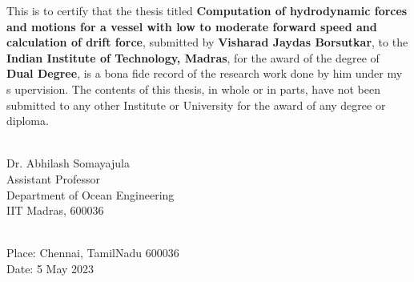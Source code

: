 \certificate


This is to certify that the thesis titled {\bf  Computation of hydrodynamic forces and motions 
for a vessel with low to moderate forward speed and calculation of drift force}, 
submitted by {\bf Visharad Jaydas Borsutkar}, to the
 {\bf Indian Institute of Technology, Madras}, for the award of the degree of 
 {\bf Dual Degree}, is a bona fide record of the research work done by him under my s
 upervision. The contents of this thesis, in whole or in parts, have not been submitted 
 to any other Institute or University for the award of any degree or diploma.
\\[3cm]

\begin{singlespacing}
\hspace*{-0.25in}
\parbox{2.5in}{
\\[0.25cm]
\noindent Dr. Abhilash Somayajula \\ [0.15cm]
\noindent Assistant Professor \\[0.15cm]
\noindent Department of Ocean Engineering\\[0.15cm]
\noindent IIT Madras, 600036
} 
\end{singlespacing}
\\[2cm]


\noindent Place: Chennai, TamilNadu 600036\\
Date: 5 May 2023  